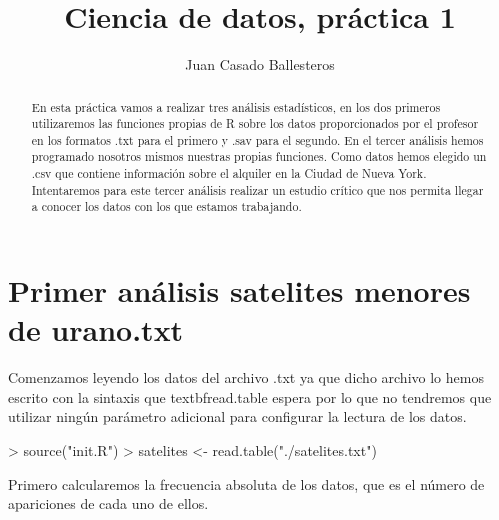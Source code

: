 \documentclass [a4paper] {article}
\title{Ciencia de datos, práctica 1}
\author{Juan Casado Ballesteros}
\begin{document}
\maketitle

\begin{abstract}
En esta práctica vamos a realizar tres análisis estadísticos, 
en los dos primeros utilizaremos las funciones propias de R sobre los datos proporcionados por el profesor en los formatos .txt para el primero y .sav para el segundo.
En el tercer análisis hemos programado nosotros mismos nuestras propias funciones. 
Como datos hemos elegido un .csv que contiene información sobre el alquiler en la Ciudad de Nueva York.
Intentaremos para este tercer análisis realizar un estudio crítico que nos permita llegar a conocer los datos con los que estamos trabajando.
\end{abstract}

\tableofcontents
\newpage

\section{Primer análisis satelites menores de urano.txt}

Comenzamos leyendo los datos del archivo .txt ya que dicho archivo lo hemos escrito con la sintaxis que textbf{read.table} espera 
por lo que no tendremos que utilizar ningún parámetro adicional para configurar la lectura de los datos.
\begin{Schunk}
\begin{Sinput}
> source("init.R")
> satelites <- read.table("./satelites.txt")
\end{Sinput}
\end{Schunk}

Primero calcularemos la frecuencia absoluta de los datos, que es el número de apariciones de cada uno de ellos.
\end{document}
